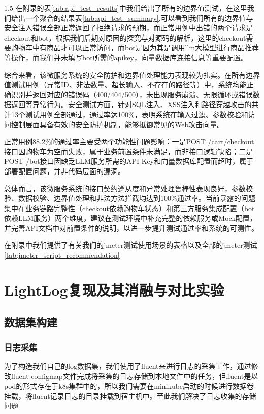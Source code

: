 \documentclass[a4paper,12pt]{report}
\begin{document}
\begin{spacing}{1.5}
在附录的表\ref{tab:api_test_results}中我们给出了所有的边界值测试，在这里我们给出一个聚合的结果表\ref{tab:api_test_summary},可以看到我们所有的边界值与安全注入错误全部正常返回了拒绝请求的预期，而正常用例中出错的两个请求是checkout和bot，根据我们后期对原因的探究与对源码的解析，这里的checkout需要购物车中有商品才可以正常访问，而bot是因为其是调用llm大模型进行商品推荐等操作，而我们并未填写bot所需的apikey，向量数据库连接信息等重要配置。

综合来看，该微服务系统的安全防护和边界值处理能力表现较为扎实。在所有边界值测试用例（异常ID、非法数量、超长输入、不存在的路径等）中，系统均能正确识别并返回对应的错误码（400/404/500），未出现服务崩溃、无限循环或错误数据返回等异常行为。安全测试方面，针对SQL注入、XSS注入和路径穿越攻击的共计13个测试用例全部通过，通过率达100\%，表明系统在输入过滤、参数校验和访问控制层面具备有效的安全防护机制，能够抵御常见的Web攻击向量。

正常用例88.2\%的通过率主要受两个功能性问题影响：一是POST /cart/checkout接口因购物车为空而失败，属于业务前置条件未满足，而非接口逻辑缺陷；二是POST /bot接口因缺乏LLM服务所需的API Key和向量数据库配置而超时，属于部署配置问题，并非代码层面的漏洞。

总体而言，该微服务系统的接口契约遵从度和异常处理鲁棒性表现良好，参数校验、数据校验、边界值处理和非法方法拦截均达到100\%通过率。当前暴露的问题集中在业务链路完整性（checkout依赖购物车状态）和第三方服务集成配置（bot依赖LLM服务）两个维度，建议在测试环境中补充完整的依赖服务或Mock配置，并完善API文档中对前置条件的说明，以进一步提升测试通过率和系统的可测性。

在附录中我们提供了有关我们的jmeter测试使用场景的表格以及全部的jmeter测试\ref{tab:jmeter_script_recommendation}

\section{LightLog复现及其消融与对比实验}
\subsection{数据集构建}
\subsubsection{日志采集}

为了构造我们自己的log数据集，我们使用了fluent来进行日志的采集工作，通过修改fluent-configmap文件完成将采集的日志存储到本地文件中的任务，但fluent是以pod的形式存在于k8s集群中的，所以我们需要在minikube启动的时候进行数据卷挂载，将fluent记录日志的目录挂载到宿主机中。至此我们解决了日志收集的存储问题


\end{spacing}
\end{document}
